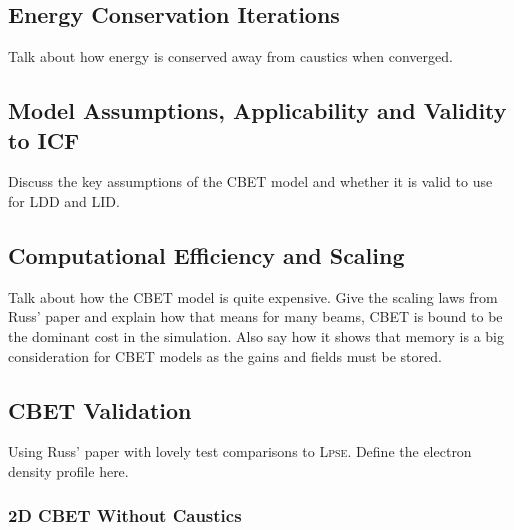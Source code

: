 \subsection{Energy Conservation Iterations}%
\label{sec:energy_conserv_iters}

Talk about how energy is conserved away from caustics when converged.

\subsection{Model Assumptions, Applicability and Validity to ICF}%
\label{sec:model_appliciability}

Discuss the key assumptions of the CBET model and whether it is valid to use for LDD and LID.

\subsection{Computational Efficiency and Scaling}

Talk about how the CBET model is quite expensive.
Give the scaling laws from Russ' paper and explain how that means for many beams, CBET is bound to be the dominant cost in the simulation.
Also say how it shows that memory is a big consideration for CBET models as the gains and fields must be stored.

\subsection{CBET Validation}
Using Russ' paper with lovely test comparisons to \textsc{Lpse}.
Define the electron density profile here.

\subsubsection{2D CBET Without Caustics}

